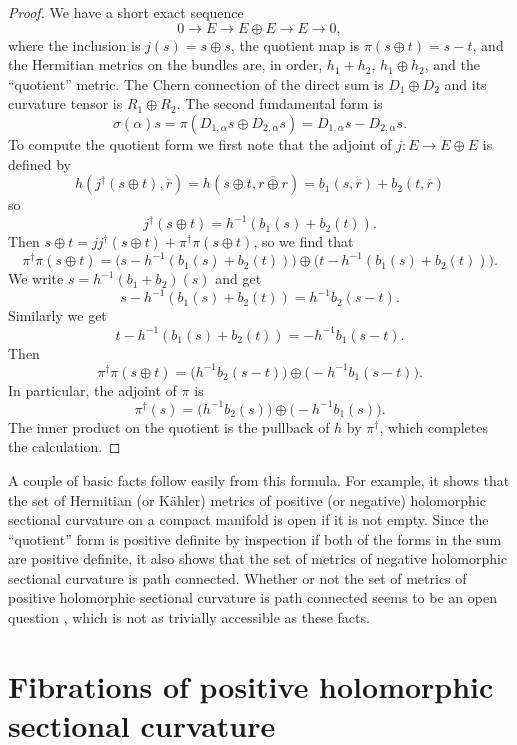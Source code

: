 \documentclass[10pt,a4paper]{amsart}
\theoremstyle{definition}
\def\ov#1{\overline{#1}}
\def\kahler{K\"ahler}
\begin{document}
\begin{proof}
We have a short exact sequence
\[
  0 \longrightarrow E \longrightarrow E \oplus E \longrightarrow E \longrightarrow 0,
\]
where the inclusion is $j(s) = s \oplus s$, the quotient map is $\pi(s \oplus t) = s - t$, and the Hermitian metrics on the bundles are, in order, $h_{1} + h_{2}$, $h_{1} \oplus h_{2}$, and the ``quotient'' metric.
The Chern connection of the direct sum is $D_{1} \oplus D_{2}$ and its curvature tensor is $R_{1} \oplus R_{2}$.
The second fundamental form is
\[
  \sigma(\alpha) s
  = \pi(D_{1,\alpha} s \oplus D_{2, \alpha} s)
  = D_{1,\alpha} s - D_{2, \alpha} s.
\]
To compute the quotient form we
first  note that the adjoint of $j : E \to E \oplus E$ is defined by
\[
h(j^\dagger( s \oplus t), \ov r)
= h( s \oplus t, \ov{r \oplus r})
= b_1(s, \ov r) + b_2(t, \ov r)
\]
so
\[
j^\dagger(s \oplus t)
= h^{-1}(b_1(s) + b_2(t)).
\]
Then $s \oplus t = jj^\dagger (s\oplus t) + \pi^\dagger \pi(s \oplus t)$, so we find that
\[
\pi^\dagger \pi(s \oplus t)
= \bigl(
s - h^{-1}(b_1(s) + b_2(t))
\bigr) \oplus
\bigl(
t - h^{-1}(b_1(s) + b_2(t))
\bigr).
\]
We write $s = h^{-1}(b_1 + b_2)(s)$ and get
\[
s - h^{-1}(b_1(s) + b_2(t))
= h^{-1}b_2(s - t).
\]
Similarly we get
\[
t - h^{-1}(b_1(s) + b_2(t))
= -h^{-1}b_1(s - t).
\]
Then
\[
\pi^\dagger \pi(s \oplus t)
= \bigl(
h^{-1}b_2(s - t)
\bigr)
\oplus
\bigl(
-h^{-1}b_1(s - t)
\bigr).
\]
In particular, the adjoint of $\pi$ is
\[
\pi^\dagger(s)
=\bigl(
h^{-1}b_2(s)
\bigr)
\oplus
\bigl(
-h^{-1}b_1(s)
\bigr).
\]
The inner product on the quotient is the pullback of $h$ by $\pi^\dagger$, which completes the calculation.
\end{proof}



A couple of basic facts follow easily from this formula.
For example, it shows that the set of Hermitian (or \kahler) metrics of positive (or negative) holomorphic sectional curvature on a compact manifold is open if it is not empty.
Since the ``quotient'' form is positive definite by inspection if both of the forms in the sum are positive definite, it also shows that the set of metrics of negative holomorphic sectional curvature is path connected.
Whether or not the set of metrics of positive holomorphic sectional curvature is path connected seems to be an open question \cite[Question~1.2]{yang2019hirzebruch}, which is not as trivially accessible as these facts.




\section{Fibrations of positive holomorphic sectional curvature}
\label{sec:grassmannian-bundles}
\end{document}
